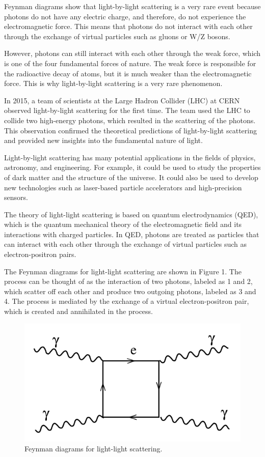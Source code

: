 \documentclass{article}
\begin{document}
Feynman diagrams show that light-by-light scattering is a very rare event because photons do not have any electric charge, and therefore, do not experience the electromagnetic force. This means that photons do not interact with each other through the exchange of virtual particles such as gluons or W/Z bosons.

However, photons can still interact with each other through the weak force, which is one of the four fundamental forces of nature. The weak force is responsible for the radioactive decay of atoms, but it is much weaker than the electromagnetic force. This is why light-by-light scattering is a very rare phenomenon.

In 2015, a team of scientists at the Large Hadron Collider (LHC) at CERN observed light-by-light scattering for the first time. The team used the LHC to collide two high-energy photons, which resulted in the scattering of the photons. This observation confirmed the theoretical predictions of light-by-light scattering and provided new insights into the fundamental nature of light.

Light-by-light scattering has many potential applications in the fields of physics, astronomy, and engineering. For example, it could be used to study the properties of dark matter and the structure of the universe. It could also be used to develop new technologies such as laser-based particle accelerators and high-precision sensors.

The theory of light-light scattering is based on quantum electrodynamics (QED), which is the quantum mechanical theory of the electromagnetic field and its interactions with charged particles. In QED, photons are treated as particles that can interact with each other through the exchange of virtual particles such as electron-positron pairs.

The Feynman diagrams for light-light scattering are shown in Figure 1. The process can be thought of as the interaction of two photons, labeled as 1 and 2, which scatter off each other and produce two outgoing photons, labeled as 3 and 4. The process is mediated by the exchange of a virtual electron-positron pair, which is created and annihilated in the process.

\begin{figure}[h]
	\centering
	\includegraphics[width=0.5\linewidth]{figures/Feynman-diagram.png}
	\caption{Feynman diagrams for light-light scattering.}
	\label{fig:light-light-scattering-feynman}
\end{figure}
\end{document}
